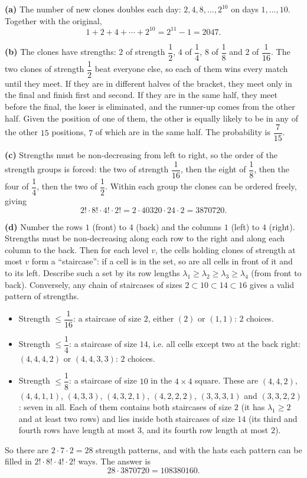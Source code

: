 \textbf{(a)} The number of new clones doubles each day: $2,4,8,\dots,2^{10}$ on days $1,\dots,10$. Together with the original,
\[1+2+4+\cdots+2^{10}=2^{11}-1=\boxed{2047}.\]

\textbf{(b)} The clones have strengths: $2$ of strength $\dfrac12$, $4$ of $\dfrac14$, $8$ of $\dfrac18$ and $2$ of $\dfrac1{16}$. The two clones of strength $\dfrac12$ beat everyone else, so each of them wins every match until they meet. If they are in different halves of the bracket, they meet only in the final and finish first and second. If they are in the same half, they meet before the final, the loser is eliminated, and the runner-up comes from the other half. Given the position of one of them, the other is equally likely to be in any of the other $15$ positions, $7$ of which are in the same half. The probability is $\boxed{\dfrac{7}{15}}$.

\textbf{(c)} Strengths must be non-decreasing from left to right, so the order of the strength groups is forced: the two of strength $\dfrac1{16}$, then the eight of $\dfrac18$, then the four of $\dfrac14$, then the two of $\dfrac12$. Within each group the clones can be ordered freely, giving
\[2!\cdot8!\cdot4!\cdot2!=2\cdot40320\cdot24\cdot2=\boxed{3870720}.\]

\textbf{(d)} Number the rows $1$ (front) to $4$ (back) and the columns $1$ (left) to $4$ (right). Strengths must be non-decreasing along each row to the right and along each column to the back. Then for each level $v$, the cells holding clones of strength at most $v$ form a ``staircase'': if a cell is in the set, so are all cells in front of it and to its left. Describe such a set by its row lengths $\lambda_1\ge\lambda_2\ge\lambda_3\ge\lambda_4$ (from front to back). Conversely, any chain of staircases of sizes $2\subset10\subset14\subset16$ gives a valid pattern of strengths.
\begin{itemize}
\item Strength $\le\dfrac1{16}$: a staircase of size $2$, either $(2)$ or $(1,1)$: $2$ choices.
\item Strength $\le\dfrac14$: a staircase of size $14$, i.e. all cells except two at the back right: $(4,4,4,2)$ or $(4,4,3,3)$: $2$ choices.
\item Strength $\le\dfrac18$: a staircase of size $10$ in the $4\times4$ square. These are $(4,4,2)$, $(4,4,1,1)$, $(4,3,3)$, $(4,3,2,1)$, $(4,2,2,2)$, $(3,3,3,1)$ and $(3,3,2,2)$: seven in all. Each of them contains both staircases of size $2$ (it has $\lambda_1\ge2$ and at least two rows) and lies inside both staircases of size $14$ (its third and fourth rows have length at most $3$, and its fourth row length at most $2$).
\end{itemize}
So there are $2\cdot7\cdot2=28$ strength patterns, and with the hats each pattern can be filled in $2!\cdot8!\cdot4!\cdot2!$ ways. The answer is
\[28\cdot3870720=\boxed{108380160}.\]
